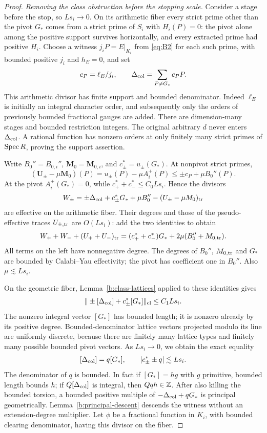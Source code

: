 \begin{proof}
\smallskip\noindent
\emph{Removing the class obstruction before the stopping scale.}
Consider a stage before the stop, so $Ls_i\to0$. On its arithmetic fiber every strict
prime other than the pivot \(G_*\) comes from a strict prime of
\(S_i\) with \(H_i(P)=0\): the pivot alone among the positive
support survives horizontally, and every extracted prime had
positive \(H_i\). Choose a witness \(j_iP=E|_{K_i}\) from
\eqref{eq:B2} for each such prime, with bounded positive \(j_i\)
and \(h_E=0\), and set
\[
 c_P=\ell_E/j_i,\qquad
 \Delta_{\rm col}=\sum_{P\ne G_*}c_PP.
\]
This arithmetic divisor has finite support and bounded denominator.
Indeed \(\ell_E\) is initially an integral character order, and
subsequently only the orders of previously bounded fractional
gauges are added. There are dimension-many stages and bounded
restriction integers. The original arbitrary \(d\) never enters
\(\Delta_{\rm col}\). A rational function has nonzero orders at
only finitely many strict primes of \(\operatorname{Spec} R\), proving the
support assertion.

Write \(B_0''=B_{0,i}''\), \(\mathbf M_0=\mathbf M_{0,i}\), and
\(c_\pm^*=u_\pm(G_*)\). At nonpivot strict primes,
\[
 (\mathbf U_\pm-\mu\mathbf M_0)(P)
       =u_\pm(P)-\mu A_i^+(P)
       \le\pm c_P+\mu B_0''(P).
\]
At the pivot \(A_i^+(G_*)=0\), while
\(c_+^*+c_-^*\le C_0Ls_i\). Hence the divisors
\[
 W_\pm=\pm\Delta_{\rm col}+c_\pm^*G_*+\mu B_0''
                         -(U_\pm-\mu M_0)_{\rm tr}
\]
are effective on the arithmetic fiber. Their degrees and those
of the pseudo-effective traces \(U_{\pm,\rm tr}\) are \(O(Ls_i)\):
add the two identities to obtain
\[
 W_++W_-+(U_++U_-)_{\rm tr}
  =(c_+^*+c_-^*)G_*+2\mu(B_0''+M_{0,\rm tr}).
\]
All terms on the left have nonnegative degree.
The degrees of \(B_0''\), \(M_{0,\rm tr}\) and \(G_*\) are bounded
by Calabi--Yau effectivity; the pivot has coefficient one in
\(B_0''\). Also \(\mu\lesssim Ls_i\).

On the geometric fiber, Lemma~\ref{b:class-lattices} applied to
these identities gives
\[
                \|\pm[\Delta_{\rm col}]+c_\pm^*[G_*]\|_{\rm cl}
                         \le C_1Ls_i .
\]
The nonzero integral vector \([G_*]\) has bounded length; it is
nonzero already by its positive degree. Bounded-denominator
lattice vectors projected modulo its line are uniformly discrete,
because there are finitely many lattice types and finitely many
possible bounded pivot vectors. As \(Ls_i\to0\), we obtain the
exact equality
\[
          [\Delta_{\rm col}]=q[G_*],\qquad
                 |c_\pm^*\pm q|\lesssim Ls_i .
\]
The denominator of \(q\) is bounded. In fact if
\([G_*]=h g\) with \(g\) primitive, bounded length bounds \(h\);
if \(Q[\Delta_{\rm col}]\) is integral, then \(Qqh\in\mathbb Z\).
After also killing the bounded torsion, a bounded positive
multiple of \(-\Delta_{\rm col}+qG_*\) is principal geometrically.
Lemma~\ref{b:principal-descent} descends the witness without an
extension-degree multiplier. Let \(\phi\) be a fractional function
in \(K_i\), with bounded clearing denominator, having this divisor
on the fiber.


\end{proof}
